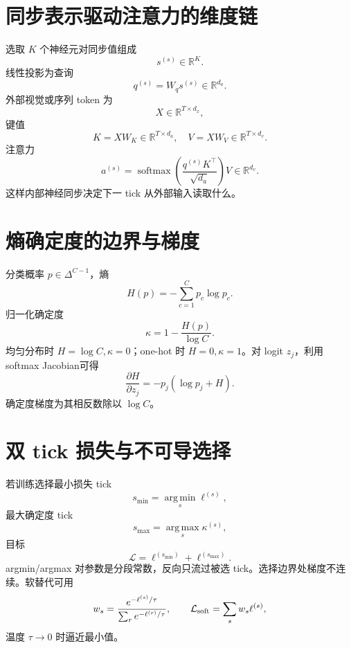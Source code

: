 \documentclass[UTF8,12pt,a4paper,fontset=none]{ctexart}
\numberwithin{equation}{section}
\newcommand{\R}{\mathbb{R}}
\newcommand{\Loss}{\mathcal{L}}
\newcommand{\softmax}{\operatorname{softmax}}
\newcommand{\argmin}{\operatorname*{arg\,min}}
\newcommand{\argmax}{\operatorname*{arg\,max}}
\begin{document}
\section{同步表示驱动注意力的维度链}
选取 $K$ 个神经元对同步值组成
\begin{equation}
 s^{(s)}\in\R^K.
\end{equation}
线性投影为查询
\begin{equation}
 q^{(s)}=W_qs^{(s)}\in\R^{d_a}.
\end{equation}
外部视觉或序列 token 为
\begin{equation}
 X\in\R^{T\times d_x},
\end{equation}
键值
\begin{equation}
 K=XW_K\in\R^{T\times d_a},
 \quad V=XW_V\in\R^{T\times d_v}.
\end{equation}
注意力
\begin{equation}
 a^{(s)}=\softmax\left(
 \frac{q^{(s)}K^\top}{\sqrt{d_a}}
 \right)V\in\R^{d_v}.
\end{equation}
这样内部神经同步决定下一 tick 从外部输入读取什么。

\section{熵确定度的边界与梯度}
分类概率 $p\in\Delta^{C-1}$，熵
\begin{equation}
 H(p)=-\sum_{c=1}^{C}p_c\log p_c.
\end{equation}
归一化确定度
\begin{equation}
 \kappa=1-\frac{H(p)}{\log C}.
\end{equation}
均匀分布时 $H=\log C,\kappa=0$；one-hot 时 $H=0,\kappa=1$。对 logit $z_j$，利用 softmax Jacobian可得
\begin{equation}
 \frac{\partial H}{\partial z_j}
 =-p_j(\log p_j+H).
\end{equation}
确定度梯度为其相反数除以 $\log C$。

\section{双 tick 损失与不可导选择}
若训练选择最小损失 tick
\begin{equation}
 s_{\min}=\argmin_s\ell^{(s)},
\end{equation}
最大确定度 tick
\begin{equation}
 s_{\max}=\argmax_s\kappa^{(s)},
\end{equation}
目标
\begin{equation}
 \Loss=\ell^{(s_{\min})}+\ell^{(s_{\max})}.
\end{equation}
argmin/argmax 对参数是分段常数，反向只流过被选 tick。选择边界处梯度不连续。软替代可用
\begin{equation}
 w_s=\frac{e^{-\ell^{(s)}/\tau}}
 {\sum_re^{-\ell^{(r)}/\tau}},
 \qquad
 \Loss_{\rm soft}=\sum_sw_s\ell^{(s)},
\end{equation}
温度 $\tau\to0$ 时逼近最小值。
\end{document}

